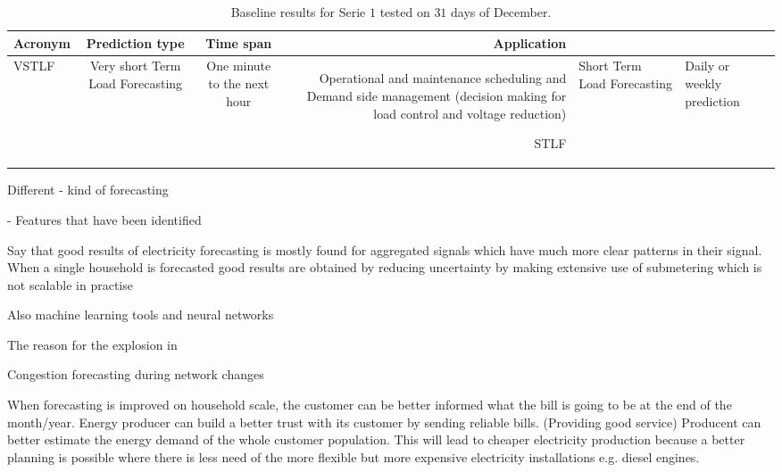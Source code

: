 \begin{table}[ht]
	\centering
	\begin{tabular}{@{}l|ccr@{}} \toprule
		\textbf{Acronym}	& \textbf{Prediction type} & \textbf{Time span} & \textbf{Application}\\\midrule
		VSTLF	& Very short Term Load Forecasting	& One minute to the next hour	& Operational and maintenance
		scheduling and Demand side management
		(decision making for load
		control and voltage reduction)
		
		STLF	&	Short Term Load Forecasting 	& 	Daily or weekly prediction
		
		
		
		\bottomrule
	\end{tabular}
	\caption{Baseline results for Serie $ 1 $ tested on $ 31 $ days of December.}
	\label{tab:summ_data_serie1}
\end{table}






Different
 - kind of forecasting
 
 

 - Features that have been identified 
 
 
 







Say that good results of electricity forecasting is mostly found for aggregated signals which have much more clear patterns in their signal. When a single household is forecasted good results are obtained by reducing uncertainty by making extensive use of submetering which is not scalable in practise





Also machine learning tools and neural networks

The reason for the explosion in 


Congestion forecasting during network changes





When forecasting is improved on household scale, the customer can be better informed what the bill is going to be at the end of the month/year.
Energy producer can build a better trust with its customer by sending reliable bills. (Providing good service)
Producent can better estimate the energy demand of the whole customer population. This will lead to cheaper electricity production because a better planning is possible where there is less need of the more 
flexible but more expensive electricity installations e.g. diesel engines.



